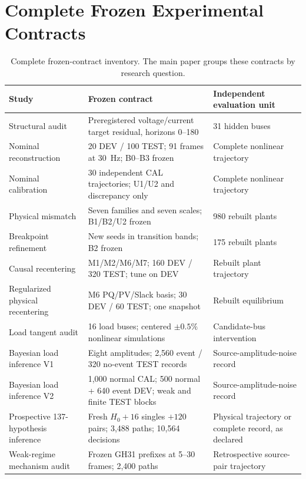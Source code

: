 \documentclass{ieeeaccess}
\begin{document}


\FloatBarrier


\section{Complete Frozen Experimental Contracts}

\begin{table}[t]
\caption{Complete frozen-contract inventory. The main paper groups these contracts by research question.}
\label{tab:supp-contracts}
\centering
\scriptsize
\setlength{\tabcolsep}{3pt}
\begin{tabularx}{\textwidth}{@{}lXX@{}}
\toprule
Study & Frozen contract & Independent evaluation unit \\
\midrule
Structural audit & Preregistered voltage/current target residual, horizons 0--180 & 31 hidden buses \\
Nominal reconstruction & 20 DEV / 100 TEST; 91 frames at 30~Hz; B0--B3 frozen & Complete nonlinear trajectory \\
Nominal calibration & 30 independent CAL trajectories; U1/U2 and discrepancy only & Complete nonlinear trajectory \\
Physical mismatch & Seven families and seven scales; B1/B2/U2 frozen & 980 rebuilt plants \\
Breakpoint refinement & New seeds in transition bands; B2 frozen & 175 rebuilt plants \\
Causal recentering & M1/M2/M6/M7; 160 DEV / 320 TEST; tune on DEV & Rebuilt plant trajectory \\
Regularized physical recentering & M6 PQ/PV/Slack basis; 30 DEV / 60 TEST; one snapshot & Rebuilt equilibrium \\
Load tangent audit & 16 load buses; centered $\pm0.5\%$ nonlinear simulations & Candidate-bus intervention \\
Bayesian load inference V1 & Eight amplitudes; 2,560 event / 320 no-event TEST records & Source-amplitude-noise record \\
Bayesian load inference V2 & 1,000 normal CAL; 500 normal + 640 event DEV; weak and finite TEST blocks & Source-amplitude-noise record \\
Prospective 137-hypothesis inference & Fresh $H_0+16$ singles $+120$ pairs; 3,488 paths; 10,564 decisions & Physical trajectory or complete record, as declared \\
Weak-regime mechanism audit & Frozen GH31 prefixes at 5--30 frames; 2,400 paths & Retrospective source-pair trajectory \\

\end{tabularx}
\end{table}
\end{document}
